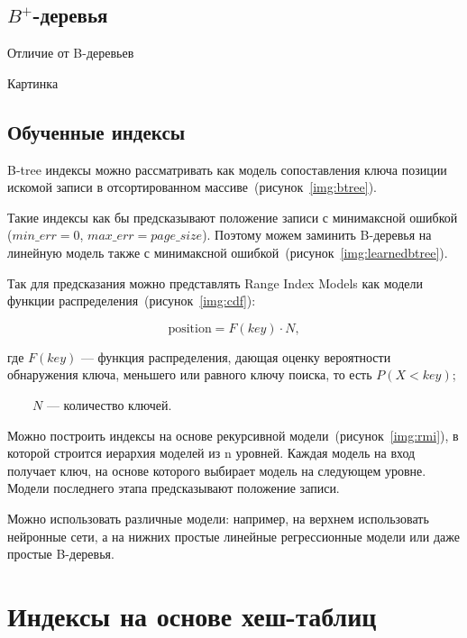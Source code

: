 \subsection{\boldmath$B^+$-деревья}

Отличие от B-деревьев

Картинка

\subsection{Обученные индексы}

B-tree индексы можно рассматривать как модель сопоставления ключа позиции
искомой записи в отсортированном массиве~(рисунок~\ref{img:btree}).


Такие индексы как бы предсказывают положение записи с минимаксной ошибкой
($min\_err = 0$, $max\_err = page\_size$). Поэтому можем заминить B-деревья на
линейную модель также с минимаксной ошибкой~(рисунок~\ref{img:learnedbtree}).


Так для предсказания можно представлять Range Index Models как модели функции
распределения~(рисунок~\ref{img:cdf}):

\begin{equation}
    \text{position} = F(key) \cdot N,
\end{equation}

где $F(key)$ --- функция распределения, дающая оценку вероятности обнаружения
ключа, меньшего или равного ключу поиска, то есть $P(X < key)$;

~~~~$N$ --- количество ключей.


Можно построить индексы на основе рекурсивной
модели~(рисунок~\ref{img:rmi}), в которой строится иерархия моделей из n
уровней. Каждая модель на вход получает ключ, на основе которого выбирает модель
на следующем уровне. Модели последнего этапа предсказывают положение записи.


Можно использовать различные модели: например, на верхнем использовать нейронные
сети, а на нижних простые линейные регрессионные модели или даже простые
B-деревья.

\section{Индексы на основе хеш-таблиц}


